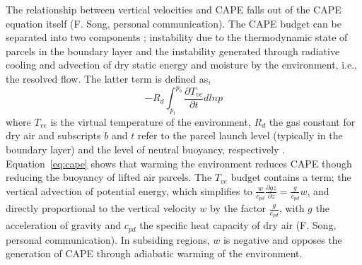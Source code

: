 \documentclass[times]{qjrms4}
\begin{document}
The relationship between vertical velocities and CAPE falls out of the CAPE equation itself (F. Song, personal communication). The CAPE budget can be separated into two components \citep{Z2002JGR}; instability due to the thermodynamic state of parcels in the boundary layer and the instability generated through radiative cooling and advection of dry static energy and moisture by the environment, i.e., the resolved flow. The latter term is defined as, 
\begin{equation}
-R_d \int_{p_t}^{p_b} \frac{\partial T_{ve}}{\partial t} dlnp \label{eq:cape}
\end{equation}
where $T_{ve}$ is the virtual temperature of the environment, $R_d$ the gas constant for dry air and subscripts $b$ and $t$ refer to the parcel launch level (typically in the boundary layer) and the level of neutral buoyancy, respectively \citep{Z2002JGR}. Equation~\ref{eq:cape} shows that warming the environment reduces CAPE though reducing the buoyancy of lifted air parcels. The $T_{ve}$ budget contains a term; the vertical advection of potential energy, which simplifies to $\frac{w}{c_{pd}} \frac{\partial gz}{\partial z} = \frac{g}{c_{pd}} w$, and directly proportional to the vertical velocity $w$ by the factor $\frac{g}{c_{pd}}$, with $g$ the acceleration of gravity and $c_{pd}$ the specific heat capacity of dry air (F. Song, personal communication). In subsiding regions, $w$ is negative and opposes the generation of CAPE through adiabatic warming of the environment.
\end{document}
